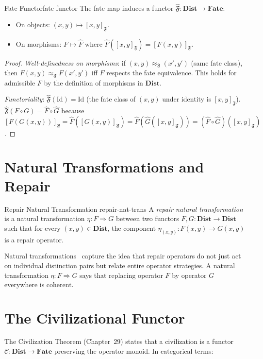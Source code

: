 \documentclass[12pt,twoside,openright]{book}
\newcommand{\fateMap}{\mathfrak{F}}
\newcommand{\fateClass}[1]{[#1]_{\mathfrak{F}}}
\newcommand{\catDist}{\mathbf{Dist}}
\newcommand{\catFate}{\mathbf{Fate}}
\newcommand{\civFunc}{\mathcal{C}}
\providecommand{\fateClass}[1]{[#1]_{\mathfrak{F}}}
\providecommand{\catDist}{\mathbf{Dist}}
\providecommand{\catFate}{\mathbf{Fate}}
\providecommand{\civFunc}{\mathcal{C}}
\providecommand{\natTrans}{\Rightarrow}
\begin{document}
\begin{theorem}{Fate Functor}{fate-functor}
The fate map induces a functor
$\hat{\fateMap}:\catDist\to\catFate$:
\begin{itemize}[nosep,leftmargin=2em]
  \item On objects: $(x,y)\mapsto\fateClass{x,y}$.
  \item On morphisms: $F\mapsto\hat{F}$ where
    $\hat{F}(\fateClass{x,y})=\fateClass{F(x,y)}$.
\end{itemize}
\begin{proof}
\emph{Well-definedness on morphisms}: if $(x,y)\approx_
\fateMap(x',y')$ (same fate class), then $F(x,y)\approx_\fateMap
F(x',y')$ iff $F$ respects the fate equivalence.
This holds for admissible $F$ by the definition of
morphisms in $\catDist$.

\emph{Functoriality}: $\hat{\fateMap}(\mathrm{Id})=\mathrm{Id}$
(the fate class of $(x,y)$ under identity is $\fateClass{x,y}$).
$\hat{\fateMap}(F\circ G)=\hat{F}\circ\hat{G}$ because
$\fateClass{F(G(x,y))}=\hat{F}(\fateClass{G(x,y)})=
\hat{F}(\hat{G}(\fateClass{x,y}))=(\hat{F}\circ\hat{G})
(\fateClass{x,y})$.
\end{proof}
\end{theorem}

\section{Natural Transformations and Repair}

\begin{definition}{Repair Natural Transformation}%
  {repair-nat-trans}
A \emph{repair natural transformation} is a natural
transformation $\eta:F\natTrans G$ between two functors
$F,G:\catDist\to\catDist$ such that for every
$(x,y)\in\catDist$, the component
$\eta_{(x,y)}:F(x,y)\to G(x,y)$ is a repair operator.
\end{definition}

Natural transformations~\cite{riehl2016} capture the idea that repair
operators do not just act on individual distinction pairs
but relate entire operator strategies. A natural
transformation $\eta:F\natTrans G$ says that replacing
operator $F$ by operator $G$ everywhere is coherent.

\section{The Civilizational Functor}

The Civilization Theorem (Chapter~29) states that a
civilization is a functor $\civFunc:\catDist\to\catFate$
preserving the operator monoid. In categorical terms:
\end{document}
